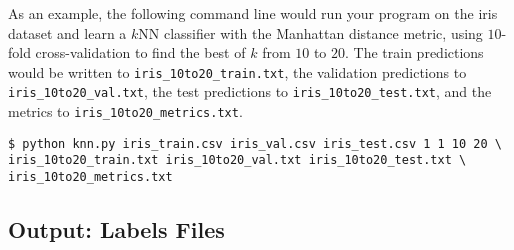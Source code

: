 \documentclass[11pt,addpoints,answers]{exam}
\begin{document}
As an example, the following command line would run your program on the iris dataset and learn a $k$NN classifier with the Manhattan distance metric, using $10$-fold cross-validation to find the best of $k$ from $10$ to $20$. The train predictions would be written to \lstinline{iris_10to20_train.txt}, the validation predictions to \lstinline{iris_10to20_val.txt}, the test predictions to \lstinline{iris_10to20_test.txt}, and the metrics to \lstinline{iris_10to20_metrics.txt}.
%
\begin{lstlisting}[language=Shell]
$ python knn.py iris_train.csv iris_val.csv iris_test.csv 1 1 10 20 \
iris_10to20_train.txt iris_10to20_val.txt iris_10to20_test.txt \ 
iris_10to20_metrics.txt
\end{lstlisting}

\subsection{Output: Labels Files}
\label{sec:labels}
\end{document}
